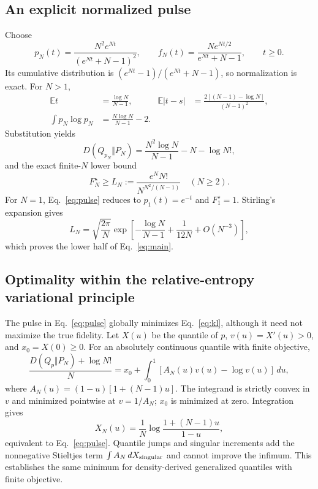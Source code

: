 \documentclass[11pt,a4paper]{article}
\newcommand{\E}{\mathbb E}
\newcommand{\KL}{D}
\begin{document}
\subsection{An explicit normalized pulse}
Choose
\begin{equation}\boxed{
 p_N(t)=\frac{N^2e^{Nt}}{(e^{Nt}+N-1)^2},\qquad
 f_N(t)=\frac{Ne^{Nt/2}}{e^{Nt}+N-1},\qquad t\ge0.}
\label{eq:pulse}
\end{equation}
Its cumulative distribution is $(e^{Nt}-1)/(e^{Nt}+N-1)$, so normalization is exact. For $N>1$,
\begin{align}
 \E t&=\frac{\log N}{N-1},&
 \E|t-s|&=\frac{2[(N-1)-\log N]}{(N-1)^2},\\
 \int p_N\log p_N&=\frac{N\log N}{N-1}-2.
\end{align}
Substitution yields
\begin{equation}
 \KL(Q_{p_N}\Vert P_N)=\frac{N^2\log N}{N-1}-N-\log N!,
\end{equation}
and the exact finite-$N$ lower bound
\begin{equation}\boxed{
 F_N^\star\ge L_N:=\frac{e^N N!}{N^{N^2/(N-1)}}\quad(N\ge2).}
\label{eq:lower}
\end{equation}
For $N=1$, Eq.~\eqref{eq:pulse} reduces to $p_1(t)=e^{-t}$ and $F_1^\star=1$. Stirling's expansion gives
\begin{equation}
 L_N=\sqrt{\frac{2\pi}{N}}\exp\!\left[-\frac{\log N}{N-1}
 +\frac1{12N}+O(N^{-3})\right],
\end{equation}
which proves the lower half of Eq.~\eqref{eq:main}.

\subsection{Optimality within the relative-entropy variational principle}
The pulse in Eq.~\eqref{eq:pulse} globally minimizes Eq.~\eqref{eq:kl}, although it need not maximize the true fidelity. Let $X(u)$ be the quantile of $p$, $v(u)=X'(u)>0$, and $x_0=X(0)\ge0$. For an absolutely continuous quantile with finite objective,
\begin{equation}
 \frac{\KL(Q_p\Vert P_N)+\log N!}{N}
 =x_0+\int_0^1[A_N(u)v(u)-\log v(u)]\,du,
\end{equation}
where $A_N(u)=(1-u)[1+(N-1)u]$. The integrand is strictly convex in $v$ and minimized pointwise at $v=1/A_N$; $x_0$ is minimized at zero. Integration gives
\begin{equation}
 X_N(u)=\frac1N\log\frac{1+(N-1)u}{1-u},
\end{equation}
equivalent to Eq.~\eqref{eq:pulse}. Quantile jumps and singular increments add the nonnegative Stieltjes term $\int A_N\,dX_{\rm singular}$ and cannot improve the infimum. This establishes the same minimum for density-derived generalized quantiles with finite objective.
\end{document}
